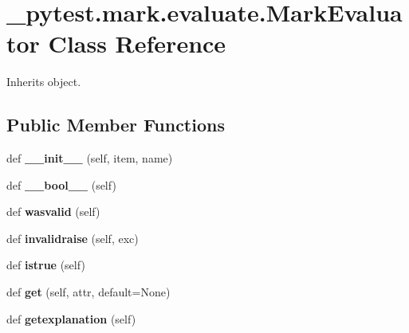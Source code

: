 \hypertarget{class__pytest_1_1mark_1_1evaluate_1_1_mark_evaluator}{}\section{\+\_\+pytest.\+mark.\+evaluate.\+Mark\+Evaluator Class Reference}
\label{class__pytest_1_1mark_1_1evaluate_1_1_mark_evaluator}


Inherits object.

\subsection*{Public Member Functions}
\begin{DoxyCompactItemize}
\item 
\mbox{\label{class__pytest_1_1mark_1_1evaluate_1_1_mark_evaluator_aa59c65ce1a06e152028af2f83ff051d0}} 
def {\bfseries \+\_\+\+\_\+init\+\_\+\+\_\+} (self, item, name)
\item 
\mbox{\label{class__pytest_1_1mark_1_1evaluate_1_1_mark_evaluator_a71d9fd002054bb39c2739eaf59327818}} 
def {\bfseries \+\_\+\+\_\+bool\+\_\+\+\_\+} (self)
\item 
\mbox{\label{class__pytest_1_1mark_1_1evaluate_1_1_mark_evaluator_a6c3827109575384f2ea79e850f7e52c6}} 
def {\bfseries wasvalid} (self)
\item 
\mbox{\label{class__pytest_1_1mark_1_1evaluate_1_1_mark_evaluator_a392e1d3cfcec3879f9457d63e0c862a4}} 
def {\bfseries invalidraise} (self, exc)
\item 
\mbox{\label{class__pytest_1_1mark_1_1evaluate_1_1_mark_evaluator_ae145a1cabb34243d0c10e903e8628478}} 
def {\bfseries istrue} (self)
\item 
\mbox{\label{class__pytest_1_1mark_1_1evaluate_1_1_mark_evaluator_a41a9e710c195a7de4589b5c1459b6330}} 
def {\bfseries get} (self, attr, default=None)
\item 
\mbox{\label{class__pytest_1_1mark_1_1evaluate_1_1_mark_evaluator_afcedda196b5bbd3fba1ec3face4ecb45}} 
def {\bfseries getexplanation} (self)
\end{DoxyCompactItemize}
